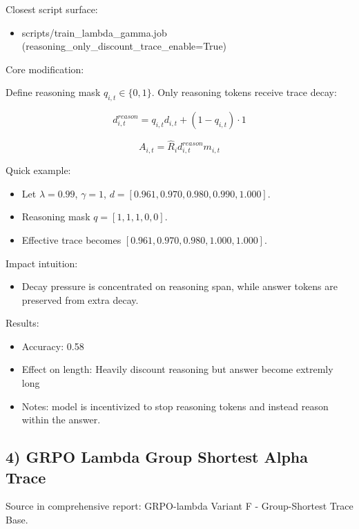 \documentclass[
]{article}
\providecommand{\tightlist}{%
  \setlength{\itemsep}{0pt}\setlength{\parskip}{0pt}}
\begin{document}
Closest script surface:

\begin{itemize}
\tightlist
\item
  scripts/train\_lambda\_gamma.job
  (reasoning\_only\_discount\_trace\_enable=True)
\end{itemize}

Core modification:

Define reasoning mask \(q_{i,t}\in\{0,1\}\). Only reasoning tokens
receive trace decay:

\[
d^{reason}_{i,t} = q_{i,t}d_{i,t} + (1-q_{i,t})\cdot 1
\]

\[
A_{i,t}=\hat{R}_i d^{reason}_{i,t} m_{i,t}
\]

Quick example:

\begin{itemize}
\tightlist
\item
  Let \(\lambda=0.99\), \(\gamma=1\),
  \(d=[0.961,0.970,0.980,0.990,1.000]\).
\item
  Reasoning mask \(q=[1,1,1,0,0]\).
\item
  Effective trace becomes \([0.961,0.970,0.980,1.000,1.000]\).
\end{itemize}

Impact intuition:

\begin{itemize}
\tightlist
\item
  Decay pressure is concentrated on reasoning span, while answer tokens
  are preserved from extra decay.
\end{itemize}

Results:

\begin{itemize}
\tightlist
\item
  Accuracy: 0.58
\item
  Effect on length: Heavily discount reasoning but answer become
  extremly long
\item
  Notes: model is incentivized to stop reasoning tokens and instead
  reason within the answer.
\end{itemize}

\subsection{4) GRPO Lambda Group Shortest Alpha
Trace}\label{grpo-lambda-group-shortest-alpha-trace}

Source in comprehensive report: GRPO-lambda Variant F - Group-Shortest
Trace Base.
\end{document}
